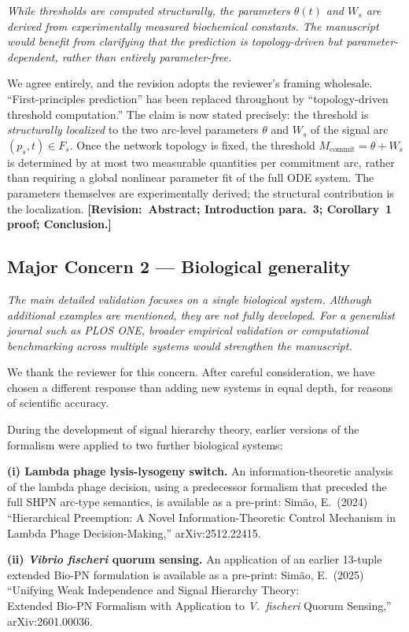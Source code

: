 \documentclass[11pt,letterpaper]{article}
\newcommand{\rquote}[1]{\begin{mdframed}[style=reviewquote]\textit{#1}\end{mdframed}}
\newcommand{\sref}[1]{\textbf{[Revision:~#1]}}
\begin{document}
\rquote{While thresholds are computed structurally, the parameters $\theta(t)$
and $W_s$ are derived from experimentally measured biochemical constants. The
manuscript would benefit from clarifying that the prediction is
\emph{topology-driven} but \emph{parameter-dependent}, rather than entirely
parameter-free.}

We agree entirely, and the revision adopts the reviewer's framing wholesale.
``First-principles prediction'' has been replaced throughout by
``topology-driven threshold computation.'' The claim is now stated precisely:
the threshold is \emph{structurally localized} to the two arc-level parameters
$\theta$ and $W_s$ of the signal arc $(p_s, t) \in F_s$. Once the network
topology is fixed, the threshold $M_{\mathrm{commit}} = \theta + W_s$ is
determined by at most two measurable quantities per commitment arc, rather than
requiring a global nonlinear parameter fit of the full ODE system. The
parameters themselves are experimentally derived; the structural contribution
is the localization.
\sref{Abstract; Introduction para.~3; Corollary~1 proof; Conclusion.}

\subsection*{Major Concern 2 --- Biological generality}

\rquote{The main detailed validation focuses on a single biological system.
Although additional examples are mentioned, they are not fully developed. For a
generalist journal such as PLOS ONE, broader empirical validation or
computational benchmarking across multiple systems would strengthen the
manuscript.}

We thank the reviewer for this concern. After careful consideration, we have
chosen a different response than adding new systems in equal depth, for reasons
of scientific accuracy.

During the development of signal hierarchy theory, earlier versions of the
formalism were applied to two further biological systems:

\textbf{(i) Lambda phage lysis-lysogeny switch.} An information-theoretic
analysis of the lambda phage decision, using a predecessor formalism that
preceded the full SHPN arc-type semantics, is available as a pre-print:
Simão, E.~(2024) ``Hierarchical Preemption: A Novel Information-Theoretic
Control Mechanism in Lambda Phage Decision-Making,'' arXiv:2512.22415.

\textbf{(ii) \textit{Vibrio fischeri} quorum sensing.} An application of an
earlier 13-tuple extended Bio-PN formulation is available as a pre-print:
Simão, E.~(2025) ``Unifying Weak Independence and Signal Hierarchy Theory:\\Extended Bio-PN Formalism with Application to \textit{V.\ fischeri} Quorum
Sensing,'' arXiv:2601.00036.
\end{document}
